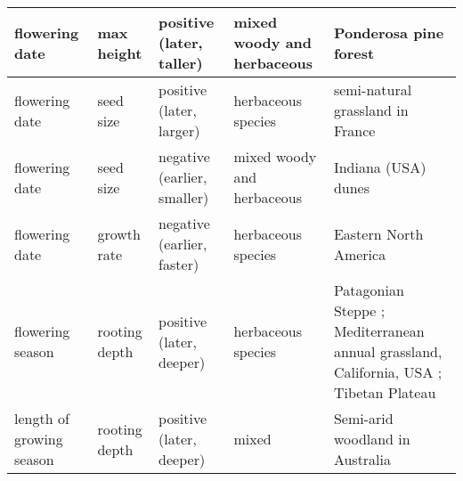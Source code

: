 \documentclass[11pt,a4paper,oneside]{article}
\begin{document}
\begin{center}
\begin{table}
\begin{minipage}{16cm}
\begin{tabular}{ | p{2cm} |  p{2.5 cm} | p{2.5 cm} | p{2.5 cm} | p{5cm} | }
flowering date	& max height & positive (later, taller) & mixed woody and herbaceous & Ponderosa pine forest \citep{Laughlin2010} \\ \hline
flowering date & seed size & positive (later, larger) & herbaceous species & semi-natural grassland in France \citep{Vile:2006nc} \\ \hline
flowering date & seed size & negative (earlier, smaller) & mixed woody and herbaceous & Indiana (USA) dunes \citep{Mazer:1989in} \\ \hline
flowering date	& growth rate & negative (earlier, faster)	& herbaceous species & Eastern North America \citep{Sun:2011eu} \\ \hline
flowering season & rooting depth & positive (later, deeper) & herbaceous species & Patagonian Steppe \citep{Golluscio:1993xi}; Mediterranean annual grassland, California, USA \citep{Gulmon1983}; Tibetan Plateau \citep{Dorji2013} \\ \hline
length of growing season & rooting depth & positive (later, deeper) & mixed & Semi-arid woodland in Australia \citep{Campanella2008} \\ \hline
\end{tabular}
\vspace{-0.75\skip\footins}
   \renewcommand{\footnoterule}{}
  \end{minipage}
\end{table}
\end{center}
\end{document}
